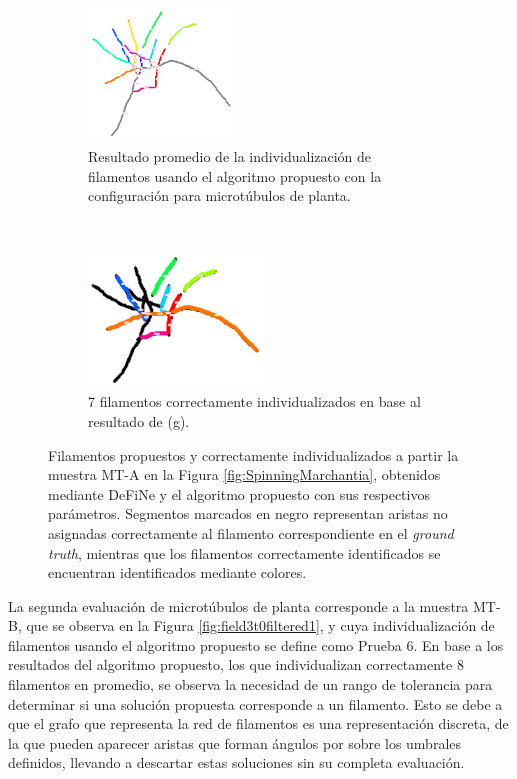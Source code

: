 \begin{figure}[h!]
    \begin{subfigure}[t]{0.49\textwidth}
        \centering
        \includegraphics[height=1.4in]{resultImages/50-ROIs-Spinning-Marchantia-phil-s10-v05-nobg-antLabeled.png}
        \caption{Resultado promedio de la individualizaci\'on de filamentos usando el algoritmo propuesto con la configuraci\'on para microt\'ubulos de planta.}
        \label{SpinningMarchantiaResults-worstPhil}
    \end{subfigure}
    ~ 
    \begin{subfigure}[t]{0.49\textwidth}
        \centering
        \includegraphics[height=1.4in]{resultImages/50-ROIs-Spinning-Marchantia-phil-s10-v05-exactMatch-antLabeled-thick.png}
        \caption{7 filamentos correctamente individualizados en base al resultado de (g).}
        \label{fig:SpinningMarchantiaResults-worstPhilExact}
    \end{subfigure}
    
    \caption{Filamentos propuestos y correctamente individualizados a partir la muestra MT-A en la Figura \ref{fig:SpinningMarchantia}, obtenidos mediante DeFiNe y el algoritmo propuesto con sus respectivos par\'ametros. Segmentos marcados en negro representan aristas no asignadas correctamente al filamento correspondiente en el {\it ground truth}, mientras que los filamentos correctamente identificados se encuentran identificados mediante colores.}
    \label{fig:SpinningMarchantiaResults}
\end{figure}

\clearpage
\newpage


La segunda evaluaci\'on de microt\'ubulos de planta corresponde a la muestra MT-B, que se observa en la Figura \ref{fig:field3t0filtered1}, y cuya individualizaci\'on de filamentos usando el algoritmo propuesto se define como Prueba 6. En base a los resultados del algoritmo propuesto, los que individualizan correctamente 8 filamentos en promedio, se observa la necesidad de un rango de tolerancia para determinar si una soluci\'on propuesta corresponde a un filamento. Esto se debe a que el grafo que representa la red de filamentos es una representaci\'on discreta, de la que pueden aparecer aristas que forman \'angulos por sobre los umbrales definidos, llevando a descartar estas soluciones sin su completa evaluaci\'on.

